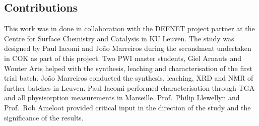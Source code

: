 \subsection*{Contributions}

This work was in done in collaboration with the DEFNET project partner
at the Centre for Surface Chemistry and Catalysis in KU Leuven. 
The study was designed by Paul Iacomi and João Marreiros during 
the secondment undertaken in COK as part of this project.
Two PWI master students, Giel Arnauts and Wouter Arts helped with
the synthesis, leaching and characterisation of the first trial batch.
João Marreiros conducted the synthesis, leaching, \gls{XRD} and \gls{NMR} of
further batches in Leuven. Paul Iacomi performed characterisation
through \gls{TGA} and all physisorption measurements in Marseille.
Prof.\ Philip Llewellyn and Prof.\ Rob Ameloot provided critical
input in the direction of the study and the significance of the 
results.